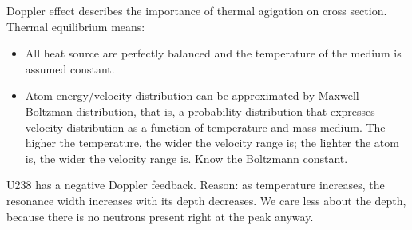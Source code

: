 \documentclass{school-22.211-notes}
\date{February 27, 2012}
\begin{document}
\maketitle


\clearpage
Doppler effect describes the importance of thermal agigation on cross section. Thermal equilibrium means: 
\begin{itemize}
\item All heat source are perfectly balanced and the temperature of the medium is assumed constant. 
\item Atom energy/velocity distribution can be approximated by Maxwell-Boltzman distribution, that is, a probability distribution that expresses velocity distribution as a function of temperature and mass medium. The higher the temperature, the wider the velocity range is; the lighter the atom is, the wider the velocity range is. Know the Boltzmann constant. 
\end{itemize}

U238 has a negative Doppler feedback. Reason: as temperature increases, the resonance width increases with its depth decreases. We care less about the depth, because there is no neutrons present right at the peak anyway. 
\end{document}
